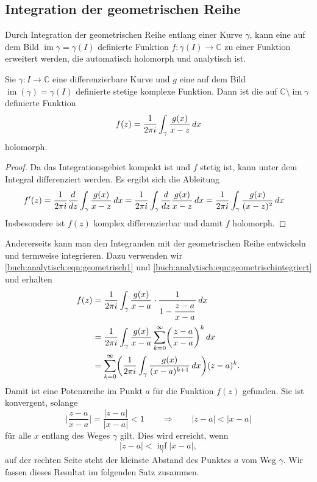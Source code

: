 %
%
%
\subsection{Integration der geometrischen Reihe}
Durch Integration der geometrischen Reihe entlang einer Kurve
$\gamma$, kann eine auf dem Bild $\operatorname{im}\gamma = \gamma(I)$
definierte Funktion $f\colon\gamma(I)\to\mathbb{C}$ zu einer
Funktion erweitert werden, die automatisch holomorph und analytisch
ist.

\begin{satz}
Sie $\gamma\colon I\to\mathbb{C}$ eine differenzierbare Kurve und $g$
eine auf dem Bild $\operatorname{im}(\gamma)=\gamma(I)$ definierte 
stetige komplexe Funktion.
Dann ist die auf $\mathbb{C}\setminus\operatorname{im}\gamma$ definierte
Funktion
\begin{equation}
f(z)
=
\frac{1}{2\pi i}
\int_\gamma
\frac{g(x)}{x-z\mathstrut}\,dx
\end{equation}
holomorph.
\end{satz}

\begin{proof}
Da das Integrationsgebiet kompakt ist und $f$ stetig ist, kann unter
dem Integral differenziert werden.
Es ergibt sich die Ableitung
\begin{align*}
f'(z)
&=
\frac{1}{2\pi i}
\frac{d}{dz}
\int_\gamma
\frac{g(x)}{x-z\mathstrut}
\,dx
=
\frac{1}{2\pi i}
\int_\gamma
\frac{d}{dz}
\frac{g(x)}{x-z\mathstrut}
\,dx
=
\frac{1}{2\pi i}
\int_\gamma
\frac{g(x)}{(x-z\mathstrut)^2}
\,dx
\end{align*}
Insbesondere ist $f(z)$ komplex differenzierbar und damit $f$ holomorph.
\end{proof}

Andererseits kann man den Integranden mit der geometrischen Reihe
entwickeln und termweise integrieren.
Dazu verwenden wir
\eqref{buch:analytisch:eqn:geometrisch1}
und
\eqref{buch:analytisch:eqn:geometrischintegriert}
und erhalten
\begin{align}
f(z)
&=
\frac{1}{2\pi i}
\int_\gamma
\frac{g(x)}{x-a}
\cdot
\frac{1}{\displaystyle1-\frac{z-a\mathstrut}{x-a\mathstrut}}
\,dx
\notag
\\
&=
\frac{1}{2\pi i}
\int_\gamma
\frac{g(x)}{x-a}
\sum_{k=0}^\infty
\biggl(
\frac{z-a\mathstrut}{x-a\mathstrut}
\biggr)^k
\,dx
\notag
\\
&=
\sum_{k=0}^\infty
\biggl(
\frac{1}{2\pi i}
\int_\gamma
\frac{g(x)}{(x-a)^{k+1}}
\,dx
\biggr)
(z-a)^k.
\label{buch:analytisch:eqn:reihe}
\end{align}
Damit ist eine Potenzreihe im Punkt $a$ für die Funktion
$f(z)$ gefunden.
Sie ist konvergent, solange 
\[
\biggl|
\frac{z-a}{x-a}
\biggr|
=
\frac{|z-a|}{|x-a|}
<
1
\qquad\Rightarrow\qquad
|z-a| < |x-a|
\]
für alle $x$ entlang des Weges $\gamma$ gilt.
Dies wird erreicht, wenn 
\[
|z-a| < \inf_{\gamma} |x-a|,
\]
auf der rechten Seite steht der kleinste Abstand des Punktes $a$ vom
Weg $\gamma$.
Wir fassen dieses Resultat im folgenden Satz zusammen.

